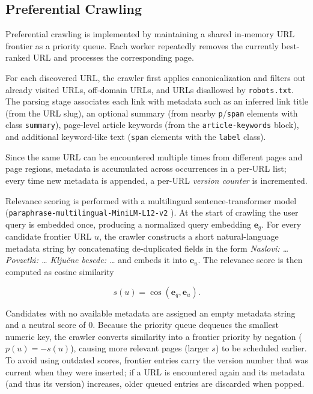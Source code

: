 \documentclass[conference]{IEEEtran}
\begin{document}
\subsection{Preferential Crawling}
Preferential crawling is implemented by maintaining a shared in-memory URL frontier as a priority queue. Each worker repeatedly removes the currently best-ranked URL and processes the corresponding page.

For each discovered URL, the crawler first applies canonicalization and filters out already visited URLs, 
off-domain URLs, and URLs disallowed by \texttt{robots.txt}. The parsing stage associates each link with metadata such as an inferred link title (from the URL slug), an optional summary (from nearby \texttt{p}/\texttt{span} elements with class \texttt{summary}), page-level article keywords (from the \texttt{article-keywords} block), and additional keyword-like text (\texttt{span} elements with the \texttt{label} class).

Since the same URL can be encountered multiple times from different pages and page regions, metadata is accumulated across occurrences in a per-URL list; every time new metadata is appended, a per-URL \emph{version counter} is incremented.

Relevance scoring is performed with a multilingual sentence-transformer model (\texttt{paraphrase-multilingual-MiniLM-L12-v2} \cite{BERTmodel}). At the start of crawling the user query is embedded once, producing a normalized query embedding $\mathbf{e}_q$. For every candidate frontier URL $u$, the crawler constructs a short natural-language metadata string by concatenating de-duplicated fields in the form \emph{Naslovi: \dots{} Povzetki: \dots{} Ključne besede: \dots{}} and embeds it into $\mathbf{e}_u$. The relevance score is then computed as cosine similarity

\begin{equation}
s(u) = \cos(\mathbf{e}_q, \mathbf{e}_u).
\end{equation}

Candidates with no available metadata are assigned an empty metadata string and a neutral score of $0$.
Because the priority queue dequeues the smallest numeric key, 
the crawler converts similarity into a frontier priority by negation ($p(u)=-s(u)$), causing more 
relevant pages (larger $s$) to be scheduled earlier. To avoid using outdated scores, frontier entries 
carry the version number that was current when they were inserted; if a URL is encountered again and 
its metadata (and thus its version) increases, older queued entries are discarded when popped. 
\end{document}
